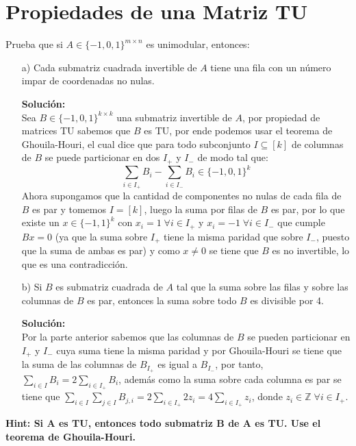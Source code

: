 \documentclass[10pt]{article}
\theoremstyle{plain}
\theoremstyle{definition}
\begin{document}
\section{Propiedades de una Matriz TU}
Prueba que si $A\in\{-1,0,1\}^{m\times n}$ es unimodular, entonces:
\begin{itemize}
    \item[a)] Cada submatriz cuadrada invertible de $A$ tiene una fila con un número impar de coordenadas no nulas.
    
    \textbf{Solución:}\\
    Sea $B\in \{-1,0,1\}^{k\times k}$ una submatriz invertible de $A$, por propiedad de matrices TU sabemos que $B$ es TU, por ende podemos usar el teorema de Ghouila-Houri, el cual dice que para todo subconjunto $I\subseteq[k]$ de columnas de $B$ se puede particionar en dos $I_{+}$ y $I_{-}$ de modo tal que:
    \begin{equation*}
        \sum_{i\in I_{+}}B_{i}- \sum_{i\in I_{-}}B_{i} \in \{-1, 0, 1\}^{k}
    \end{equation*}
    Ahora supongamos que la cantidad de componentes no nulas de cada fila de $B$ es par y tomemos $I=[k]$, luego la suma por filas de $B$ es par, por lo que existe un $x\in\{-1,1\}^{k}$ con $x_{i} = 1 \;\forall i \in I_{+}$ y $x_{i} = -1 \;\forall i \in I_{-}$ que cumple $Bx=0$ (ya que la suma sobre $I_{+}$ tiene la misma paridad que sobre $I_{-}$, puesto que la suma de ambas es par) y como $x\neq0$ se tiene que $B$ es no invertible, lo que es una contradicción.
    \item[b)] Si $B$ es submatriz cuadrada de $A$ tal que la suma sobre las filas y sobre las columnas de $B$ es par, entonces la suma sobre todo $B$ es divisible por 4.
    
    \textbf{Solución:}\\
    Por la parte anterior sabemos que las columnas de $B$ se pueden particionar en $I_{+}$ y $I_{-}$ cuya suma tiene la misma paridad y por Ghouila-Houri se tiene que la suma de las columnas de $B_{I_{+}}$ es igual a $B_{I_{-}}$, por tanto, $\sum_{i\in I}B_{i}=2\sum_{i\in I_{+}}B_{i}$, además como la suma sobre cada columna es par se tiene que $\sum_{i\in I}\sum_{j\in I}B_{j,i} = 2\sum_{i\in I_{+}}2 z_{i}=4\sum_{i\in I_{+}}z_{i}$, donde $z_{i}\in\mathbb{Z} \;\forall i \in I_{+}$.
      
\end{itemize}
\textbf{Hint: Si A es TU, entonces todo submatriz B de A es TU. Use el teorema de Ghouila-Houri.}
\end{document}
